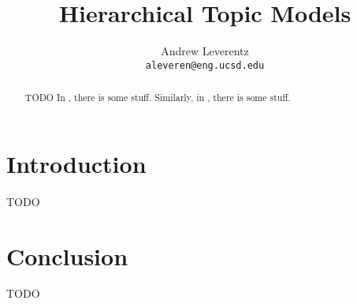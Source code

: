 \documentclass{article}
\title{Hierarchical Topic Models}
\author{
  Andrew Leverentz \\
  \texttt{aleveren@eng.ucsd.edu} \\
}
\begin{document}
\maketitle

\begin{abstract}
TODO
In \cite{paisley2015nested}, there is some stuff.
Similarly, in \cite{blei2010nested}, there is some stuff.
\end{abstract}

\section{Introduction}
TODO

\section{Conclusion}
TODO


\nocite{*}
%


\end{document}
